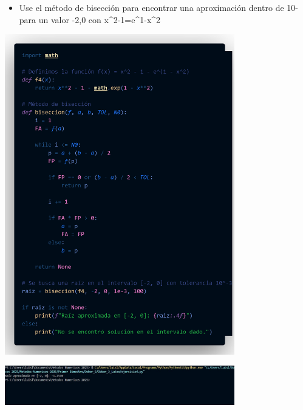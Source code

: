 \documentclass[12pt]{article}
\begin{document}
\vspace{0.5cm}

\begin{itemize}
    \item {Use el método de bisección para encontrar una aproximación dentro de 10- para un valor  -2,0 
    con x^2-1=e^1-x^2}

\end{itemize}

\begin{minipage}{0.75\textwidth}
    \raggedleft
    \includegraphics[width=0.75\textwidth]{inFiles/Figures/cd7.png}
\end{minipage}

\vspace{0.5cm}

\begin{minipage}{0.75\textwidth}
    \raggedleft
    \includegraphics[width=0.75\textwidth]{inFiles/Figures/ejec5.jpg}
\end{minipage}

\vspace{0.5cm}
\end{document}
